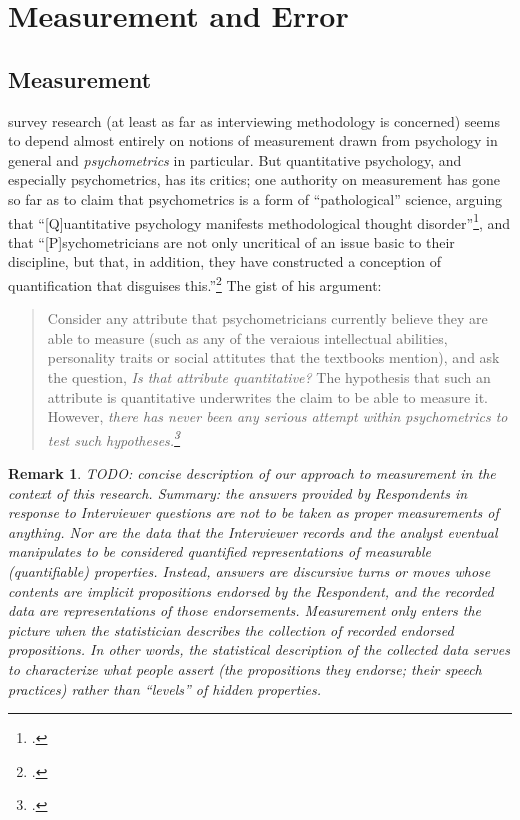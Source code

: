 \documentclass[11pt,twoside]{article}
\newtheorem{remark}{Remark}
\newcommand{\sr}{survey research}
\newcommand{\Iver}{Interviewer}
\newcommand{\R}{Respondent}
\begin{document}
\section{Measurement and Error}

\subsection{Measurement}

\sr{} (at least as far as interviewing methodology is concerned) seems
to depend almost entirely on notions of measurement drawn from
psychology in general and \textit{psychometrics} in particular.  But
quantitative psychology, and especially psychometrics, has its
critics; one authority on measurement has gone so far as to claim that
psychometrics is a form of \enquote{pathological} science, arguing
that \enquote{[Q]uantitative psychology manifests methodological
  thought disorder}\footcite{michell_quantitative_1997}, and that
\enquote{[P]sychometricians are not only uncritical of an issue basic
  to their discipline, but that, in addition, they have constructed a
  conception of quantification that disguises
  this.}\footcite[639]{michell_normal_2000} The gist of his argument:

\blockquote[][]{Consider any attribute that psychometricians currently
  believe they are able to measure (such as any of the veraious
  intellectual abilities, personality traits or social attitutes that
  the textbooks mention), and ask the question, \textit{Is that
    attribute quantitative?}  The hypothesis that such an attribute is
  quantitative underwrites the claim to be able to measure it.
  However, \textit{there has never been any serious attempt within
    psychometrics to test such
    hypotheses.\footcite[648; \textit{emph. added}]{michell_normal_2000}}}


\begin{remark}
  TODO: concise description of our approach to measurement in the
  context of this research.  Summary: the answers provided by \R{}s in
  response to \Iver{} questions are not to be taken as proper
  \textit{measurements} of anything.  Nor are the data that the
  \Iver{} records and the analyst eventual manipulates to be
  considered quantified representations of measurable (quantifiable)
  properties.  Instead, answers are discursive turns or moves whose
  \textit{contents} are implicit propositions endorsed by the \R{},
  and the recorded data are representations of those endorsements.
  Measurement only enters the picture when the statistician describes
  the collection of recorded endorsed propositions.  In other words,
  the statistical description of the collected data serves to
  characterize what people assert (the propositions they endorse;
  their speech practices) rather than \enquote{levels} of hidden
  properties.
\end{remark}
\end{document}

